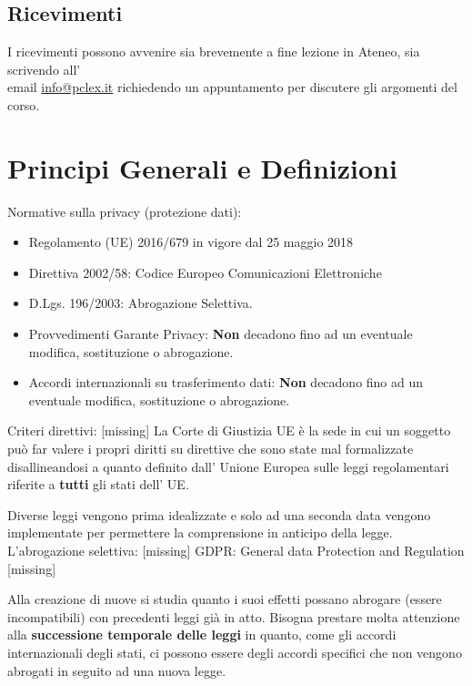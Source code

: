\documentclass[twocolumn]{article}
\begin{document}
\subsection{Ricevimenti}
I ricevimenti possono avvenire sia brevemente a fine lezione in Ateneo, sia scrivendo all' \\ email \href{mailto:info@pclex.it}{info@pclex.it} richiedendo un appuntamento per discutere gli argomenti del corso.
\section{Principi Generali e Definizioni}

Normative sulla privacy (protezione dati): \begin{itemize}
    \item Regolamento (UE) 2016/679 in vigore dal 25 maggio 2018
    \item Direttiva 2002/58: Codice Europeo Comunicazioni Elettroniche
    \item D.Lgs. 196/2003: Abrogazione Selettiva.
    \item Provvedimenti Garante Privacy: \textbf{Non} decadono fino ad un eventuale modifica, sostituzione o abrogazione.
    \item Accordi internazionali su trasferimento dati: \textbf{Non} decadono fino ad un eventuale modifica, sostituzione o abrogazione.
\end{itemize}
Criteri direttivi: [missing] \newline
La Corte di Giustizia UE è la sede in cui un soggetto può far valere i propri diritti su direttive che sono state mal formalizzate disallineandosi a quanto definito dall' Unione Europea sulle leggi regolamentari riferite a \textbf{tutti} gli stati dell' UE.

Diverse leggi vengono prima idealizzate e solo ad una seconda data vengono implementate per permettere la comprensione in anticipo della legge.
L'abrogazione selettiva: [missing]
\newline GDPR: General data Protection and Regulation [missing] \newline

Alla creazione di nuove si studia quanto i suoi effetti possano abrogare (essere incompatibili) con precedenti leggi già in atto.
Bisogna prestare molta attenzione alla \textbf{successione temporale delle leggi} in quanto, come gli accordi internazionali degli stati, ci possono essere degli accordi specifici che non vengono abrogati in seguito ad una nuova legge.
\end{document}
